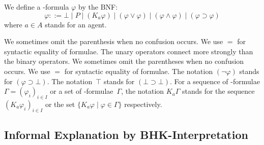   \begin{definition}
   \label{formula}
   We define a \iec-formula $\varphi$ by the BNF:
   \[
   \varphi ::= \bot\mid P\mid
   (K_a\varphi)\mid(\varphi\vee\varphi)\mid(\varphi\land\varphi)\mid
   (\varphi\supset\varphi)
   \]
   where $a\in A$ stands for an agent.
  \end{definition}
  We sometimes omit the parenthesis when no confusion occurs. We use $=$ for syntactic
  equality of formulae.
  \noindent The unary operators connect more strongly than the binary operators.
  We sometimes omit the parentheses when no confusion occurs. We use $=$ for syntactic
  equality of formulae.  The notation $(\neg \varphi)$ stands for $(\varphi\supset \bot)$.
  The notation~$\top$ stands for $(\bot\supset\bot)$.
  For a sequence of \iec-formulae $\Gamma = (\varphi_i)_{i\in I}$ or a set of \iec-formulae~$\Gamma$,
  the notation $K_a \Gamma$ stands for the sequence $(K_a \varphi_i)_{i\in I}$ or the set
  $\{K_a\varphi\mid \varphi\in \Gamma\}$ respectively.

  \subsection{Informal Explanation by BHK-Interpretation}
  \label{bhk}


